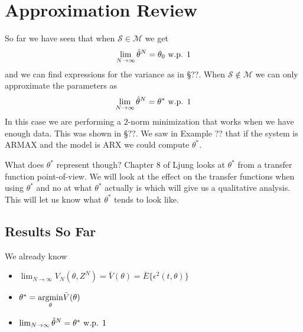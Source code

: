 
\mainmatter
\setcounter{page}{1}

\lectureseries[\course]{\course}

\date{November 19, 2009}

\setaddress

\setcounter{lecture}{15}
\setcounter{chapter}{15}


\section{Approximation Review}
So far we have seen that when $\mathcal{S}\in\mathcal{M}$ we get
$$\lim_{N\to\infty}\hat{\theta}^N=\theta_0 \text{ w.p. } 1$$
and we can find expressions for the variance as in \S??. When $\mathcal{S}\notin\mathcal{M}$ we can only approximate the parameters as
$$\lim_{N\to\infty}\hat{\theta}^N=\theta^\ast \text{ w.p. } 1$$
In this case we are performing a $2$-norm minimization that works when we have enough data. This was shown in \S??. We saw in Example ?? that if the system is ARMAX and the model is ARX we could compute $\theta^\ast$.

What does $\theta^\ast$ represent though? Chapter 8 of Ljung looks at $\theta^\ast$ from a transfer function point-of-view. We will look at the effect on the transfer functions when using $\theta^\ast$ and no at what $\theta^\ast$ actually is which will give us a qualitative analysis. This will let us know what $\theta^\ast$ tends to look like.

\subsection{Results So Far}
We already know
\begin{itemize}
\item $\lim_{N\to\infty}V_N(\theta,Z^N) = \bar{V}(\theta) = \bar{E}\{\epsilon^2(t,\theta)\}$
\item $\theta^\ast = \underset{\theta}{\operatorname{argmin}}\bar{V}(\theta)$
\item $\lim_{N\to\infty}\hat{\theta}^N = \theta^\ast \text{ w.p. } 1$
\end{itemize}

